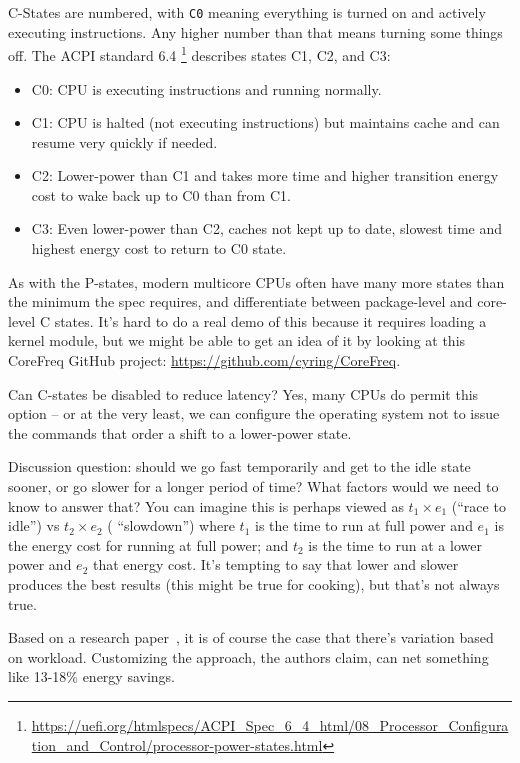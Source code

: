 C-States are numbered, with \texttt{C0} meaning everything is turned on and actively executing instructions. Any higher number than that means turning some things off. The ACPI standard 6.4 \footnote{ \url{https://uefi.org/htmlspecs/ACPI_Spec_6_4_html/08_Processor_Configuration_and_Control/processor-power-states.html} } describes states C1, C2, and C3:

\begin{itemize}
	\item C0: CPU is executing instructions and running normally.
	\item C1: CPU is halted (not executing instructions) but maintains cache and can resume very quickly if needed.
	\item C2: Lower-power than C1 and takes more time and higher transition energy cost to wake back up to C0 than from C1.
	\item C3: Even lower-power than C2, caches not kept up to date, slowest time and highest energy cost to return to C0 state.
\end{itemize}

As with the P-states, modern multicore CPUs often have many more states than the minimum the spec requires, and differentiate between package-level and core-level C states. It's hard to do a real demo of this because it requires loading a kernel module, but we might be able to get an idea of it by looking at this CoreFreq GitHub project: \url{https://github.com/cyring/CoreFreq}.

Can C-states be disabled to reduce latency? Yes, many CPUs do permit this option -- or at the very least, we can configure the operating system not to issue the commands that order a shift to a lower-power state.

Discussion question: should we go fast temporarily and get to the idle state sooner, or go slower for a longer period of time? What factors would we need to know to answer that? You can imagine this is perhaps viewed as $t_1 \times e_1$ (``race to idle'') vs $t_2 \times e_2$ ( ``slowdown'') where $t_1$ is the time to run at full power and $e_1$ is the energy cost for running at full power; and $t_2$ is the time to run at a lower power and $e_2$ that energy cost. It's tempting to say that lower and slower produces the best results (this might be true for cooking), but that's not always true. 

Based on a research paper~\cite{race-to-idle}, it is of course the case that there's variation based on workload. Customizing the approach, the authors claim, can net something like 13-18\% energy savings. 

